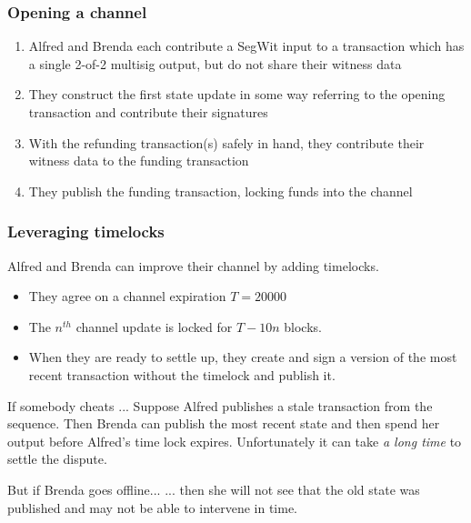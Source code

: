 \documentclass{beamer}
\begin{document}
\begin{frame}
	\frametitle{Opening a channel}
	\begin{enumerate}
		\item Alfred and Brenda each contribute a SegWit input to a transaction 
			which has a single 2-of-2 multisig output, but do not share their witness 
			data \pause
		\item They construct the first state update in some way referring to the 
			opening transaction and contribute their signatures \pause
		\item With the refunding transaction(s) safely in hand, they contribute 
			their witness data to the funding transaction  \pause
		\item They publish the funding transaction, locking funds into the channel
	\end{enumerate}
\end{frame}
\begin{frame}
	\frametitle{Leveraging timelocks}
	Alfred and Brenda can improve their channel by adding timelocks.
	\pause
	\begin{itemize}
		\item They agree on a channel expiration $ T = 20000 $ \pause
		\item The $ n^{th} $ channel update is locked for $ T - 10 n $ blocks. \pause
		\item When they are ready to settle up, they create and sign a version of 
			the most recent transaction without the timelock and publish it. \pause
	\end{itemize}
	\begin{block}{If somebody cheats ...}
		Suppose Alfred publishes a stale transaction from the sequence.  Then Brenda 
		can publish the most recent state and then spend her output before Alfred's 
		time lock expires.  Unfortunately it can take \emph{a long time} to settle 
		the dispute.
	\end{block}
	\pause
	\begin{block}{But if Brenda goes offline...}
		... then she will not see that the old state was published and may not be 
		able to intervene in time.
	\end{block}
\end{frame}
\end{document}
